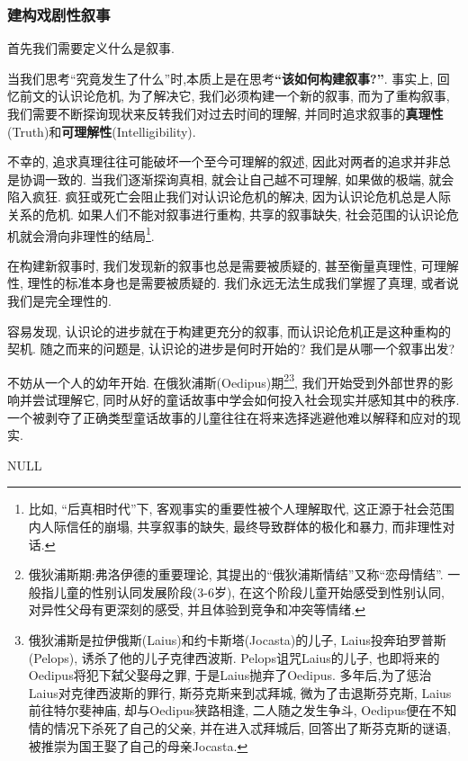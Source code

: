 \documentclass[12pt, a4paper, oneside]{ctexart}
\renewcommand{\b}{\textbf}
\newcommand{\f}{\footnote}
\newcommand{\q}[1]{\begin{questionbox}{}#1\end{questionbox}}
\newcommand{\ans}[1]{\begin{ansbox}{}#1\end{ansbox}}
\newcounter{question}[section]
\newcounter{ans}[section]
\begin{document}
\subsubsection{建构戏剧性叙事}

首先我们需要定义什么是叙事.
    
当我们思考``究竟发生了什么''时,本质上是在思考\b{``该如何构建叙事?''}. 事实上, 回忆前文的认识论危机, 为了解决它, 我们必须构建一个新的叙事, 而为了重构叙事, 我们需要不断探询现状来反转我们对过去时间的理解, 并同时追求叙事的\b{真理性}(Truth)和\b{可理解性}(Intelligibility).

不幸的, 追求真理往往可能破坏一个至今可理解的叙述, 因此对两者的追求并非总是协调一致的. 当我们逐渐探询真相, 就会让自己越不可理解, 如果做的极端, 就会陷入疯狂. 疯狂或死亡会阻止我们对认识论危机的解决, 因为认识论危机总是人际关系的危机. 如果人们不能对叙事进行重构, 共享的叙事缺失, 社会范围的认识论危机就会滑向非理性的结局\f{比如, ``后真相时代''下, 客观事实的重要性被个人理解取代, 这正源于社会范围内人际信任的崩塌, 共享叙事的缺失, 最终导致群体的极化和暴力, 而非理性对话. }. 

在构建新叙事时, 我们发现新的叙事也总是需要被质疑的, 甚至衡量真理性, 可理解性, 理性的标准本身也是需要被质疑的. 我们永远无法生成我们掌握了真理, 或者说我们是完全理性的.

容易发现, 认识论的进步就在于构建更充分的叙事, 而认识论危机正是这种重构的契机. 随之而来的问题是, 认识论的进步是何时开始的? 我们是从哪一个叙事出发?

不妨从一个人的幼年开始. 在俄狄浦斯(Oedipus)期\f{俄狄浦斯期:弗洛伊德的重要理论, 其提出的``俄狄浦斯情结''又称``恋母情结''. 一般指儿童的性别认同发展阶段(3-6岁), 在这个阶段儿童开始感受到性别认同, 对异性父母有更深刻的感受, 并且体验到竞争和冲突等情绪. }\f{俄狄浦斯是拉伊俄斯(Laius)和约卡斯塔(Jocasta)的儿子, Laius投奔珀罗普斯(Pelops), 诱杀了他的儿子克律西波斯. Pelops诅咒Laius的儿子, 也即将来的Oedipus将犯下弑父娶母之罪, 于是Laius抛弃了Oedipus. 多年后,为了惩治Laius对克律西波斯的罪行, 斯芬克斯来到忒拜城, 微为了击退斯芬克斯, Laius前往特尔斐神庙, 却与Oedipus狭路相逢, 二人随之发生争斗, Oedipus便在不知情的情况下杀死了自己的父亲, 并在进入忒拜城后, 回答出了斯芬克斯的谜语, 被推崇为国王娶了自己的母亲Jocasta. }, 我们开始受到外部世界的影响并尝试理解它, 同时从好的童话故事中学会如何投入社会现实并感知其中的秩序. 一个被剥夺了正确类型童话故事的儿童往往在将来选择逃避他难以解释和应对的现实.



\q{}
\ans{NULL}

\end{document}
